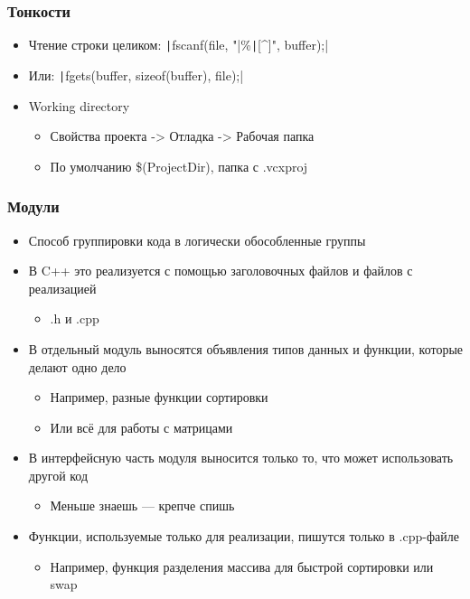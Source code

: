 \documentclass[xetex,mathserif,serif]{beamer}
\begin{document}
	\begin{frame}
		\frametitle{Тонкости}
		\begin{itemize}
			\item Чтение строки целиком: \texttt|fscanf(file, "|\%\texttt|[^\n]", buffer);|
			\item Или: \texttt|fgets(buffer, sizeof(buffer), file);|
			\item Working directory
			\begin{itemize}
				\item Свойства проекта -> Отладка -> Рабочая папка
				\item По умолчанию \$(ProjectDir), папка с .vcxproj
			\end{itemize}
		\end{itemize}
	\end{frame}

	\begin{frame}[fragile]
		\frametitle{Модули}
		\begin{itemize}
			\item Способ группировки кода в логически обособленные группы
			\item В C++ это реализуется с помощью заголовочных файлов и файлов с реализацией
			\begin{itemize}
				\item .h и .cpp
			\end{itemize}
			\item В отдельный модуль выносятся объявления типов данных и функции, которые делают одно дело
			\begin{itemize}
				\item Например, разные функции сортировки
				\item Или всё для работы с матрицами
			\end{itemize}
			\item В интерфейсную часть модуля выносится только то, что может использовать другой код
			\begin{itemize}
				\item Меньше знаешь --- крепче спишь
			\end{itemize}
			\item Функции, используемые только для реализации, пишутся только в .cpp-файле
			\begin{itemize}
				\item Например, функция разделения массива для быстрой сортировки или swap
			\end{itemize}
		\end{itemize}
	\end{frame}
\end{document}
